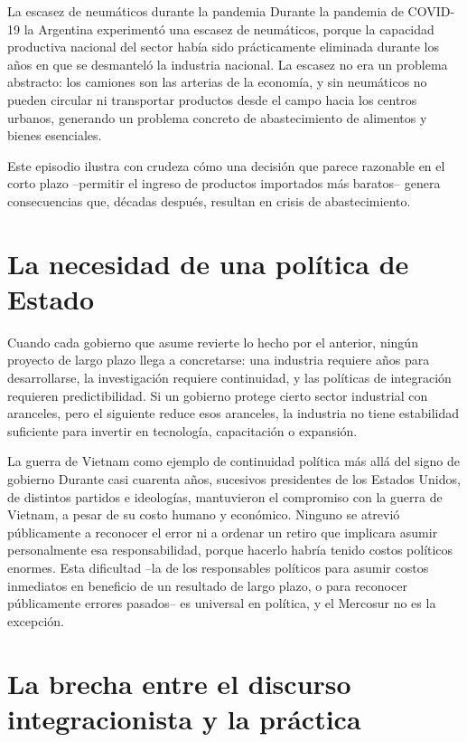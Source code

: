 \documentclass[12pt,oneside]{book}
\begin{document}
\begin{ejemplo}{La escasez de neumáticos durante la pandemia}
Durante la pandemia de COVID-19 la Argentina experimentó una escasez de neumáticos, porque la capacidad productiva nacional del sector había sido prácticamente eliminada durante los años en que se desmanteló la industria nacional. La escasez no era un problema abstracto: los camiones son las arterias de la economía, y sin neumáticos no pueden circular ni transportar productos desde el campo hacia los centros urbanos, generando un problema concreto de abastecimiento de alimentos y bienes esenciales.
\end{ejemplo}

Este episodio ilustra con crudeza cómo una decisión que parece razonable en el corto plazo --permitir el ingreso de productos importados más baratos-- genera consecuencias que, décadas después, resultan en crisis de abastecimiento.

\section{La necesidad de una política de Estado}

Cuando cada gobierno que asume revierte lo hecho por el anterior, ningún proyecto de largo plazo llega a concretarse: una industria requiere años para desarrollarse, la investigación requiere continuidad, y las políticas de integración requieren predictibilidad. Si un gobierno protege cierto sector industrial con aranceles, pero el siguiente reduce esos aranceles, la industria no tiene estabilidad suficiente para invertir en tecnología, capacitación o expansión.

\begin{ejemplo}{La guerra de Vietnam como ejemplo de continuidad política más allá del signo de gobierno}
Durante casi cuarenta años, sucesivos presidentes de los Estados Unidos, de distintos partidos e ideologías, mantuvieron el compromiso con la guerra de Vietnam, a pesar de su costo humano y económico. Ninguno se atrevió públicamente a reconocer el error ni a ordenar un retiro que implicara asumir personalmente esa responsabilidad, porque hacerlo habría tenido costos políticos enormes. Esta dificultad --la de los responsables políticos para asumir costos inmediatos en beneficio de un resultado de largo plazo, o para reconocer públicamente errores pasados-- es universal en política, y el Mercosur no es la excepción.
\end{ejemplo}

\section{La brecha entre el discurso integracionista y la práctica}
\end{document}
